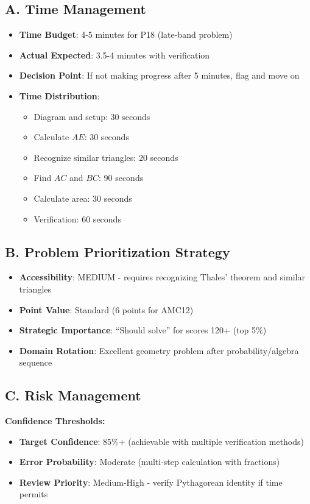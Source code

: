 \documentclass[]{article}
\begin{document}
\begin{competitionbox}
\subsection*{A. Time Management}
\begin{itemize}[leftmargin=*]
    \item \textbf{Time Budget}: 4-5 minutes for P18 (late-band problem)
    \item \textbf{Actual Expected}: 3.5-4 minutes with verification
    \item \textbf{Decision Point}: If not making progress after 5 minutes, flag and move on
    \item \textbf{Time Distribution}:
    \begin{itemize}
        \item Diagram and setup: 30 seconds
        \item Calculate $AE$: 30 seconds
        \item Recognize similar triangles: 20 seconds
        \item Find $AC$ and $BC$: 90 seconds
        \item Calculate area: 30 seconds
        \item Verification: 60 seconds
    \end{itemize}
\end{itemize}

\subsection*{B. Problem Prioritization Strategy}
\begin{itemize}[leftmargin=*]
    \item \textbf{Accessibility}: MEDIUM - requires recognizing Thales' theorem and similar triangles
    \item \textbf{Point Value}: Standard (6 points for AMC12)
    \item \textbf{Strategic Importance}: ``Should solve'' for scores 120+ (top 5\%)
    \item \textbf{Domain Rotation}: Excellent geometry problem after probability/algebra sequence
\end{itemize}

\subsection*{C. Risk Management}

\textbf{Confidence Thresholds:}
\begin{itemize}[leftmargin=*]
    \item \textbf{Target Confidence}: 85\%+ (achievable with multiple verification methods)
    \item \textbf{Error Probability}: Moderate (multi-step calculation with fractions)
    \item \textbf{Review Priority}: Medium-High - verify Pythagorean identity if time permits
\end{itemize}


\end{competitionbox}
\end{document}
